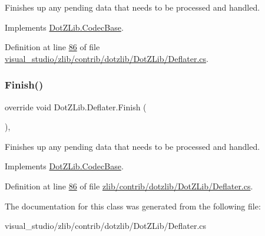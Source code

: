 Finishes up any pending data that needs to be processed and handled. 



Implements \hyperlink{class_dot_z_lib_1_1_codec_base_abab96cb01a9b983452a31777e3a1e633}{Dot\+Z\+Lib.\+Codec\+Base}.



Definition at line \hyperlink{visual__studio_2zlib_2contrib_2dotzlib_2_dot_z_lib_2_deflater_8cs_source_l00086}{86} of file \hyperlink{visual__studio_2zlib_2contrib_2dotzlib_2_dot_z_lib_2_deflater_8cs_source}{visual\+\_\+studio/zlib/contrib/dotzlib/\+Dot\+Z\+Lib/\+Deflater.\+cs}.

\mbox{\label{class_dot_z_lib_1_1_deflater_a84507769a20a13c2ff48cfcef8f5c13b}} 
\subsubsection{\texorpdfstring{Finish()}{Finish()}\hspace{0.1cm}{\footnotesize\ttfamily [2/2]}}
{\footnotesize\ttfamily override void Dot\+Z\+Lib.\+Deflater.\+Finish (\begin{DoxyParamCaption}{ }\end{DoxyParamCaption})\hspace{0.3cm}{\ttfamily [inline]}, {\ttfamily [virtual]}}



Finishes up any pending data that needs to be processed and handled. 



Implements \hyperlink{class_dot_z_lib_1_1_codec_base_abab96cb01a9b983452a31777e3a1e633}{Dot\+Z\+Lib.\+Codec\+Base}.



Definition at line \hyperlink{zlib_2contrib_2dotzlib_2_dot_z_lib_2_deflater_8cs_source_l00086}{86} of file \hyperlink{zlib_2contrib_2dotzlib_2_dot_z_lib_2_deflater_8cs_source}{zlib/contrib/dotzlib/\+Dot\+Z\+Lib/\+Deflater.\+cs}.



The documentation for this class was generated from the following file\+:\begin{DoxyCompactItemize}
\item 
visual\+\_\+studio/zlib/contrib/dotzlib/\+Dot\+Z\+Lib/\+Deflater.\+cs\end{DoxyCompactItemize}
